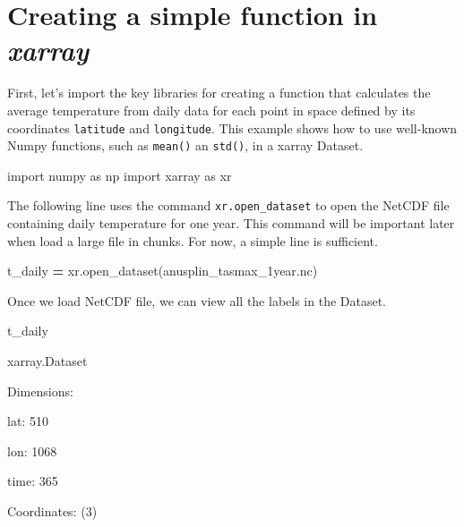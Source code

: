 \documentclass[
]{book}
\newenvironment{Shaded}{\begin{snugshade}}{\end{snugshade}}
\newcommand{\ImportTok}[1]{#1}
\newcommand{\NormalTok}[1]{#1}
\newcommand{\OperatorTok}[1]{\textcolor[rgb]{0.81,0.36,0.00}{\textbf{#1}}}
\newcommand{\StringTok}[1]{\textcolor[rgb]{0.31,0.60,0.02}{#1}}
\begin{document}
\hypertarget{creating-a-simple-function-in-xarray}{%
\section{\texorpdfstring{Creating a simple function in \emph{xarray}}{Creating a simple function in xarray}}\label{creating-a-simple-function-in-xarray}}

First, let's import the key libraries for creating a function that calculates the average temperature from daily data for each point in space defined by its coordinates \texttt{latitude} and \texttt{longitude}. This example shows how to use well-known Numpy functions, such as \texttt{mean()} an \texttt{std()}, in a xarray Dataset.

\begin{Shaded}
\begin{Highlighting}[]
\ImportTok{import}\NormalTok{ numpy }\ImportTok{as}\NormalTok{ np}
\ImportTok{import}\NormalTok{ xarray }\ImportTok{as}\NormalTok{ xr}
\end{Highlighting}
\end{Shaded}

The following line uses the command \texttt{xr.open\_dataset} to open the NetCDF file containing daily temperature for one year. This command will be important later when load a large file in chunks. For now, a simple line is sufficient.

\begin{Shaded}
\begin{Highlighting}[]
\NormalTok{t\_daily }\OperatorTok{=}\NormalTok{ xr.open\_dataset(}\StringTok{\textquotesingle{}anusplin\_tasmax\_1year.nc\textquotesingle{}}\NormalTok{)}
\end{Highlighting}
\end{Shaded}

Once we load NetCDF file, we can view all the labels in the Dataset.

\begin{Shaded}
\begin{Highlighting}[]
\NormalTok{t\_daily}
\end{Highlighting}
\end{Shaded}

xarray.Dataset

Dimensions:

{lat}: 510

{lon}: 1068

{time}: 365

Coordinates: {(3)}
\end{document}
